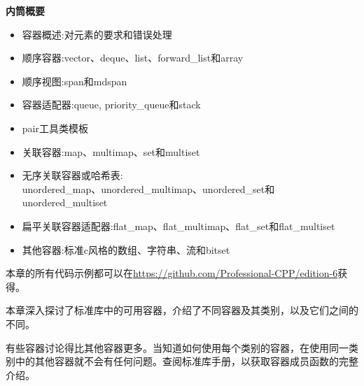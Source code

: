 \noindent
\textbf{内筒概要}

\begin{itemize}
\item
容器概述:对元素的要求和错误处理

\item
顺序容器:vector、deque、list、forward\_list和array

\item
顺序视图:span和mdspan

\item
容器适配器:queue, priority\_queue和stack

\item
pair工具类模板

\item
关联容器:map、multimap、set和multiset

\item
无序关联容器或哈希表:\\unordered\_map、unordered\_multimap、unordered\_set和unordered\_multiset

\item
扁平关联容器适配器:flat\_map、flat\_multimap、flat\_set和flat\_multiset

\item
其他容器:标准c风格的数组、字符串、流和bitset
\end{itemize}

本章的所有代码示例都可以在\url{https://github.com/Professional-CPP/edition-6}获得。

本章深入探讨了标准库中的可用容器，介绍了不同容器及其类别，以及它们之间的不同。

有些容器讨论得比其他容器更多。当知道如何使用每个类别的容器，在使用同一类别中的其他容器就不会有任何问题。查阅标准库手册，以获取容器成员函数的完整介绍。

